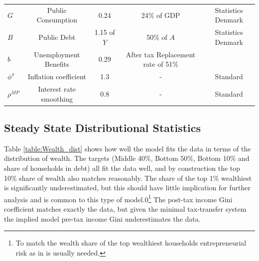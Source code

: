 \begin{table}[H]
{\begin{threeparttable}
{\begin{tabular}{lcccc}
\midrule
$G$  & Public Consumption & 0.24 &  24\% of GDP  & Statistics Denmark   \\
$B$  & Public Debt & 1.15 of $Y$ &  50\% of $A$  & Statistics Denmark   \\
$b$  & Unemployment Benefits & 0.29 &  After tax Replacement rate of 51\% & \citet{schindler2011labor}  \\
$\phi^{\pi}$  & Inflation coefficient & 1.3 &  -  & Standard  \\
$\rho^{MP}$  & Interest rate smoothing & 0.8 &  -  & Standard  \\
\midrule[\heavyrulewidth]
\end{tabular}
}
\end{threeparttable}
}
\end{table}




\subsection{Steady State Distributional Statistics}
Table \ref{table:Wealth_dist} shows how well the model fits the data in terms of the distribution of wealth. The targets (Middle 40\%, Bottom 50\%, Bottom 10\% and share of households in debt) all fit the data well, and by construction the top 10\% share of wealth also matches reasonably. The share of the top 1\% wealthiest is significantly underestimated, but this should have little implication for further analysis and is common to this type of model.0\footnote{To match the wealth share of the top wealthiest households entrepreneurial risk as in \citet{benhabib2014wealth} is usually needed.} The post-tax income Gini coefficient matches exactly the data, but given the minimal tax-transfer system the implied model pre-tax income Gini underestimates the data. 




